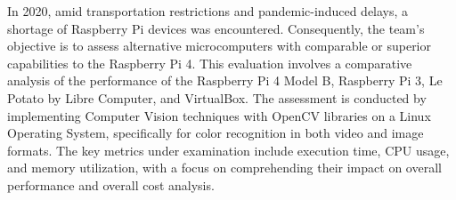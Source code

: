 In 2020, amid transportation restrictions and pandemic-induced delays, a
shortage of Raspberry Pi devices was encountered. Consequently, the team's
objective is to assess alternative microcomputers with comparable or
superior capabilities to the Raspberry Pi 4. This evaluation involves a
comparative analysis of the performance of the Raspberry Pi 4 Model B,
Raspberry Pi 3, Le Potato by Libre Computer, and VirtualBox. The
assessment is conducted by implementing Computer Vision techniques with
OpenCV libraries on a Linux Operating System, specifically for color
recognition in both video and image formats. The key metrics under
examination include execution time, CPU usage, and memory utilization,
with a focus on comprehending their impact on overall performance and
overall cost analysis.